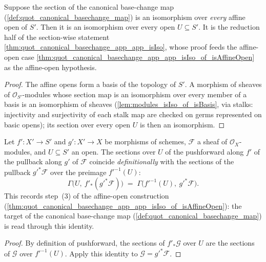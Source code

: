 \begin{theorem}\leanok
  \label{thm:quot_canonical_basechange_app_app_isIso_of_affineCover}
  Suppose the section of the canonical base-change map
  (\cref{def:quot_canonical_basechange_map}) is an isomorphism over
  \emph{every} affine open of \(S'\). Then it is an isomorphism over every
  open \(U \subseteq S'\). It is the reduction half of the section-wise
  statement \cref{thm:quot_canonical_basechange_app_app_isIso}, whose proof
  feeds the affine-open case
  \cref{thm:quot_canonical_basechange_app_app_isIso_of_isAffineOpen} as the
  affine-open hypothesis.
\end{theorem}
\begin{proof}\leanok
  The affine opens form a basis of the topology of \(S'\). A morphism of
  sheaves of \(\mathcal O_{S'}\)-modules whose section map is an
  isomorphism over every member of a basis is an isomorphism of sheaves
  (\cref{lem:modules_isIso_of_isBasis}, via stalks: injectivity and
  surjectivity of each stalk map are checked on germs represented on basic
  opens); its section over every open \(U\) is then an isomorphism.
\end{proof}

\begin{lemma}\leanok
  \label{lem:quot_pushforward_pullback_section_eq}
  Let \(f' : X' \to S'\) and \(g' : X' \to X\) be morphisms of schemes,
  \(\mathcal{F}\) a sheaf of \(\mathcal{O}_X\)-modules, and \(U \subseteq S'\)
  an open. The sections over \(U\) of the pushforward along \(f'\) of the
  pullback along \(g'\) of \(\mathcal{F}\) coincide \emph{definitionally}
  with the sections of the pullback \(g'^* \mathcal{F}\) over the preimage
  \(f'^{-1}(U)\):
  \[
    \Gamma\bigl(U,\ f'_* (g'^* \mathcal{F})\bigr)
    \;=\;
    \Gamma\bigl(f'^{-1}(U),\ g'^* \mathcal{F}\bigr).
  \]
  This records step~(3) of the affine-open construction
  (\cref{thm:quot_canonical_basechange_app_app_isIso_of_isAffineOpen}): the
  target of the canonical base-change map
  (\cref{def:quot_canonical_basechange_map}) is read through this identity.
\end{lemma}
\begin{proof}
  By definition of pushforward, the sections of \(f'_*\mathcal G\) over
  \(U\) are the sections of \(\mathcal G\) over \(f'^{-1}(U)\). Apply this
  identity to \(\mathcal G=g'^*\mathcal F\).
\end{proof}

